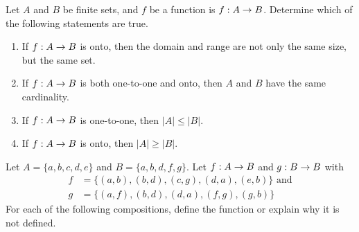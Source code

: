  Let $A$ and $B$ be finite sets, and $f$ be a function is $f: A \rightarrow B$.  Determine which of the following statements are true. 
\begin{enumerate}[label=(\alph*),itemsep=0pt,parsep=0pt,topsep=0pt,partopsep=0pt]
    \item {}
    	If $f: A \rightarrow B$ is onto, then the domain and range are not only the same size, but the same set. 
    \item {}
    	If $f: A \rightarrow B$ is both one-to-one and onto, then $A$ and $B$ have the same cardinality. 
    \item {}
    	If $f: A \rightarrow B$ is one-to-one, then $|A| \leq |B|$.
    \item {} 
    	If $f: A \rightarrow B$ is onto, then $|A| \geq |B|$.
\end{enumerate}
    \ifprintanswers
        \vspace{-10pt}
    \fi
\begin{solution}
\end{solution}



 Let $A = \{a, b, c, d, e \}$ and $B = \{ a, b, d, f, g\}$.  Let $f : A \rightarrow B$ and $g : B \rightarrow B$ with 
\begin{align*}
    f &= \{(a, b), (b, d), (c, g), (d, a), (e, b) \} \text{  and} \\
    g &= \{ (a, f), (b, d), (d, a), (f, g), (g, b) \}
\end{align*}
For each of the following compositions, define the function or explain why it is not defined.

